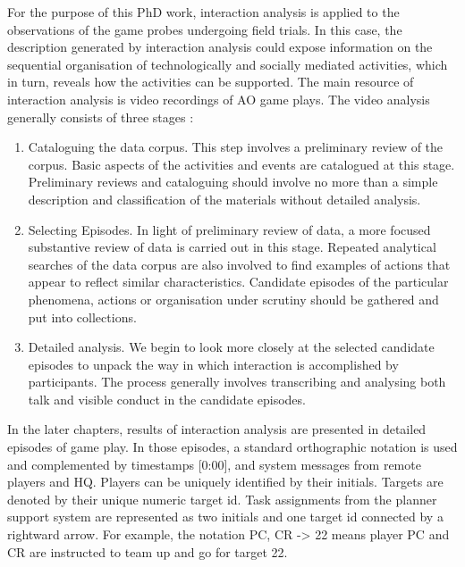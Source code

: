 For the purpose of this PhD work, interaction analysis is applied to the observations of the game probes undergoing field trials. In this case, the description generated by interaction analysis could expose information on the sequential organisation of technologically and socially mediated activities, which in turn, reveals how the activities can be supported. The main resource of interaction analysis is video recordings of \ac{AO} game plays. The video analysis generally consists of three stages \citep{Heath2010} :

\begin{enumerate}

\item Cataloguing the data corpus. This step involves a preliminary review of the corpus. Basic aspects of the activities and events are catalogued at this stage. Preliminary reviews and cataloguing should involve no more than a simple description and classification of the materials without detailed analysis. \\

\item Selecting Episodes. In light of preliminary review of data, a more focused substantive review of data is carried out in this stage. Repeated analytical searches of the data corpus are also involved to find examples of actions that appear to reflect similar characteristics. Candidate episodes of the particular phenomena, actions or organisation under scrutiny should be gathered and put into collections. \\

\item Detailed analysis.  We begin to look more closely at the selected candidate episodes to unpack the way in which interaction is accomplished by participants. The process generally involves transcribing and analysing both talk and visible conduct in the candidate episodes. \\ 

\end{enumerate}

In the later chapters, results of interaction analysis are presented in detailed episodes of game play. In those episodes, a standard orthographic notation is used \citep{Jordan1995} and complemented by timestamps [0:00], and system messages from remote players and HQ. Players can be uniquely identified by their initials. Targets are denoted by their unique numeric target id. Task assignments from the planner support system are represented as two initials and one target id connected by a rightward arrow. For example, the notation PC, CR -> 22 means player PC and CR are instructed to team up and go for target 22.\\




